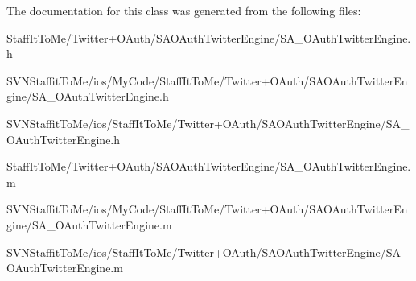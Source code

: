 \-The documentation for this class was generated from the following files\-:\begin{DoxyCompactItemize}
\item 
\-Staff\-It\-To\-Me/\-Twitter+\-O\-Auth/\-S\-A\-O\-Auth\-Twitter\-Engine/\-S\-A\-\_\-\-O\-Auth\-Twitter\-Engine.\-h\item 
\-S\-V\-N\-Staffit\-To\-Me/ios/\-My\-Code/\-Staff\-It\-To\-Me/\-Twitter+\-O\-Auth/\-S\-A\-O\-Auth\-Twitter\-Engine/\-S\-A\-\_\-\-O\-Auth\-Twitter\-Engine.\-h\item 
\-S\-V\-N\-Staffit\-To\-Me/ios/\-Staff\-It\-To\-Me/\-Twitter+\-O\-Auth/\-S\-A\-O\-Auth\-Twitter\-Engine/\-S\-A\-\_\-\-O\-Auth\-Twitter\-Engine.\-h\item 
\-Staff\-It\-To\-Me/\-Twitter+\-O\-Auth/\-S\-A\-O\-Auth\-Twitter\-Engine/\-S\-A\-\_\-\-O\-Auth\-Twitter\-Engine.\-m\item 
\-S\-V\-N\-Staffit\-To\-Me/ios/\-My\-Code/\-Staff\-It\-To\-Me/\-Twitter+\-O\-Auth/\-S\-A\-O\-Auth\-Twitter\-Engine/\-S\-A\-\_\-\-O\-Auth\-Twitter\-Engine.\-m\item 
\-S\-V\-N\-Staffit\-To\-Me/ios/\-Staff\-It\-To\-Me/\-Twitter+\-O\-Auth/\-S\-A\-O\-Auth\-Twitter\-Engine/\-S\-A\-\_\-\-O\-Auth\-Twitter\-Engine.\-m\end{DoxyCompactItemize}
